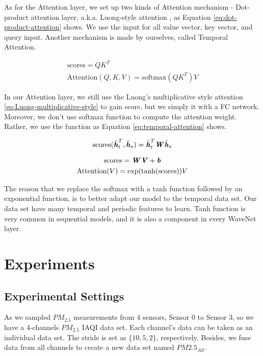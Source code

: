 \documentclass[
twocolumn,
]{ceurart}
\begin{document}
As for the Attention layer, we set up two kinds of Attention mechanism - Dot-product attention layer, a.k.a. Luong-style attention \cite{luong2015effective}, as Equation \ref{eq:dot-product-attention} shows. We use the input for all value vector, key vector, and query input. Another mechanism is made by ourselves, called Temporal Attention. 

\begin{gather}
    \text{scores}=QK^T \\
    \text{Attention}(Q, K, V ) = \text{softmax}(QK^T)V
    \label{eq:dot-product-attention}
\end{gather}

In our Attention layer, we still use the Luong's multiplicative style attention \ref{eq:Luong-multiplicative-style} to gain score, but we simply it with a FC network. Moreover, we don't use softmax function to compute the attention weight. Rather, we use the function as Equation \ref{eq:temporal-attention} shows.

\begin{equation}
    \text{scores}(\bar {\textbf{\textit h}}_t^T,\bar {\textbf{\textit h}}_s)=\bar {\textbf{\textit h}}_t^T\textbf{\textit W}\bar {\textbf{\textit h}}_s 
    \label{eq:Luong-multiplicative-style}
\end{equation}

\begin{gather}
    \text{scores}=\textbf{\textit W}\textbf{\textit V}+\textbf{\textit b} \\
    \text{Attention}(V) = \text{exp}(\text{tanh}(\text{scores}))V
    \label{eq:temporal-attention}
\end{gather}

The reason that we replace the softmax with a tanh function followed by an exponential function, is to better adapt our model to the temporal data set. Our data set have many temporal and periodic features to learn. Tanh function is very common in sequential models, and it is also a component in every WaveNet layer.

\section{Experiments}

\subsection{Experimental Settings}

As we sampled $PM_{2.5}$ measurements from 4 sensors, Sensor 0 to Sensor 3, so we have a 4-channels $PM_{2.5}$ IAQI data set. Each channel's data can be taken as an individual data set. The stride is set as $\{10, 5, 2\}$, respectively. Besides, we fuse data from all channels to create a new data set named $PM2.5_{All}$.
\end{document}
